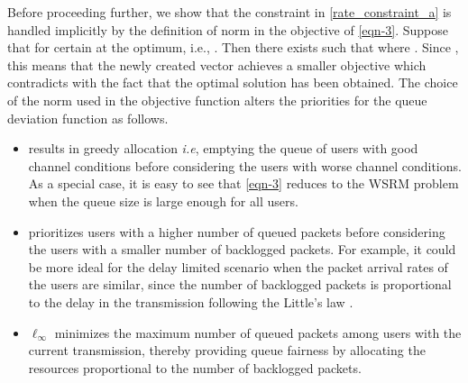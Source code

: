 Before proceeding further, we show that the constraint in \eqref{rate_constraint_a} is handled implicitly by the definition of norm  in the objective of \eqref{eqn-3}. Suppose that  for certain  at the optimum, i.e., . Then there exists  such that  where . Since , this means that the newly created vector  achieves a smaller objective which contradicts with the fact that the optimal solution has been obtained. The choice of the norm  used in the objective function \cite{berry2004cross,qps_cioffi} alters the priorities for the queue deviation function as follows.
\begin{itemize}
\item {} results in greedy allocation \textit{i.e}, emptying the queue of users with good channel conditions before considering the users with worse channel conditions. As a special case, it is easy to see that \eqref{eqn-3} reduces to the \ac{WSRM} problem when the queue size is large enough for all users.
\item {} prioritizes users with a higher number of queued packets before considering the users with a smaller number of backlogged packets. For example, it could be more ideal for the delay limited scenario when the packet arrival rates of the users are similar, since the number of backlogged packets is proportional to the delay in the transmission following the Little's law \cite{neely2010stochastic}.
\item \(\ell_{\infty} \) minimizes the maximum number of queued packets among users with the current transmission, thereby providing queue fairness by allocating the resources proportional to the number of backlogged packets.
\end{itemize} 